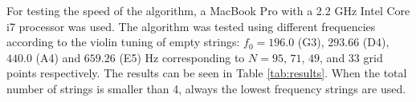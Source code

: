     
    For testing the speed of the algorithm, a MacBook Pro with a 2.2 GHz Intel Core i7 processor was used. The algorithm was tested using different frequencies according to the violin tuning of empty strings: $f_0 = 196.0$ (G3), $293.66$ (D4), $440.0$ (A4) and $659.26$ (E5) Hz corresponding to $N = 95$, $71$, $49$, and $33$ grid points respectively. The results can be seen in Table \ref{tab:results}. When the total number of strings is smaller than 4, always the lowest frequency strings are used.
       
    
